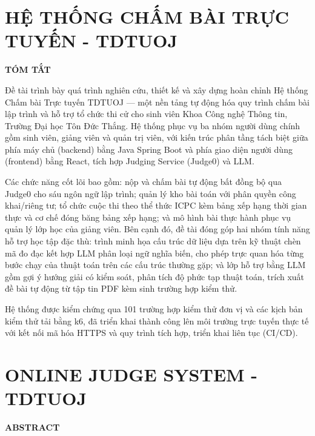 \documentclass[12pt, a4paper]{report}
\newcommand{\thesistitle}{HỆ THỐNG CHẤM BÀI TRỰC TUYẾN - TDTUOJ}
\newcommand{\thesistitleen}{ONLINE JUDGE SYSTEM - TDTUOJ}
\begin{document}
\chapter*{\thesistitle}
\begin{center}\textbf{TÓM TẮT}\end{center}

\noindent Đề tài trình bày quá trình nghiên cứu, thiết kế và xây dựng hoàn chỉnh Hệ thống
Chấm bài Trực tuyến TDTUOJ — một nền tảng tự động hóa quy trình chấm bài lập trình và hỗ
trợ tổ chức thi cử cho sinh viên Khoa Công nghệ Thông tin, Trường Đại học Tôn Đức Thắng.
Hệ thống phục vụ ba nhóm người dùng chính gồm sinh viên, giảng viên và quản trị viên, với
kiến trúc phân tầng tách biệt giữa phía máy chủ (backend) bằng Java Spring Boot và phía
giao diện người dùng (frontend) bằng React, tích hợp Judging Service (Judge0) và \ac{LLM}.

\noindent Các chức năng cốt lõi bao gồm: nộp và chấm bài tự động bất đồng bộ qua Judge0
cho sáu ngôn ngữ lập trình; quản lý kho bài toán với phân quyền công khai/riêng tư; tổ chức
cuộc thi theo thể thức \ac{ICPC} kèm bảng xếp hạng thời gian thực và cơ chế đóng băng bảng
xếp hạng; và mô hình bài thực hành phục vụ quản lý lớp học của giảng viên. Bên cạnh đó, đề
tài đóng góp hai nhóm tính năng hỗ trợ học tập đặc thù: trình minh họa cấu trúc dữ liệu
dựa trên kỹ thuật chèn mã đo đạc kết hợp \ac{LLM} phân loại ngữ nghĩa biến, cho phép trực
quan hóa từng bước chạy của thuật toán trên các cấu trúc thường gặp; và lớp hỗ trợ bằng
\ac{LLM} gồm gợi ý hướng giải có kiểm soát, phân tích độ phức tạp thuật toán, trích xuất
đề bài tự động từ tập tin \ac{PDF} kèm sinh trường hợp kiểm thử.

\noindent Hệ thống được kiểm chứng qua 101 trường hợp kiểm thử đơn vị và các kịch bản kiểm
thử tải bằng k6, đã triển khai thành công lên môi trường trực tuyến thực tế với kết nối mã
hóa \ac{HTTPS} và quy trình tích hợp, triển khai liên tục (\ac{CI/CD}).

\newpage

\chapter*{\thesistitleen}
\begin{center}\textbf{ABSTRACT}\end{center}
\end{document}
